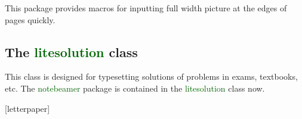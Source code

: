 \documentclass[11pt,svgnames]{article}
\def\pkg#1{\textcolor{DarkGreen}{\textsf{#1}}}
\begin{document}
This package provides macros for inputting full width picture at the edges of pages quickly.

\subsection{The \pkg{litesolution} class}

This class is designed for typesetting solutions of problems in exams, textbooks, etc. The \pkg{notebeamer} package is contained in the \pkg{litesolution} class now.

\clearpage
{}[letterpaper]

\pagecolor{yellow!2}

\hidenotelinefalse      {}
\hidenotelinetrue       {}

\hidenotelinefalse      {}

    \newnotepage
\end{document}
